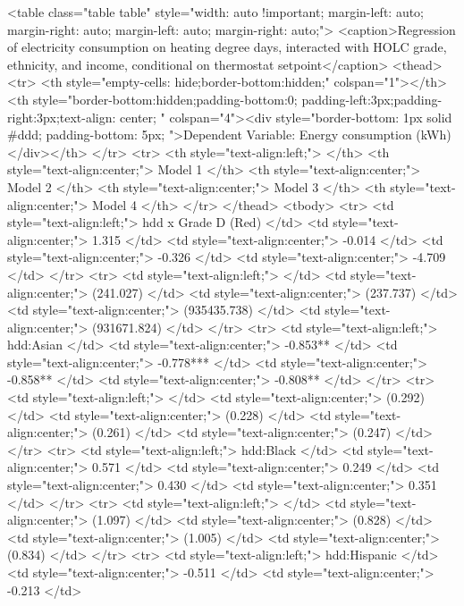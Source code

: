 <table class="table table" style="width: auto !important; margin-left: auto; margin-right: auto; margin-left: auto; margin-right: auto;">
<caption>Regression of electricity consumption on heating degree days, interacted with HOLC grade, ethnicity, and income, conditional on thermostat setpoint\label{tab:electricresponsethemset2}</caption>
 <thead>
<tr>
<th style="empty-cells: hide;border-bottom:hidden;" colspan="1"></th>
<th style="border-bottom:hidden;padding-bottom:0; padding-left:3px;padding-right:3px;text-align: center; " colspan="4"><div style="border-bottom: 1px solid #ddd; padding-bottom: 5px; ">Dependent Variable: Energy consumption (kWh)</div></th>
</tr>
  <tr>
   <th style="text-align:left;">   </th>
   <th style="text-align:center;"> Model 1 </th>
   <th style="text-align:center;"> Model 2 </th>
   <th style="text-align:center;"> Model 3 </th>
   <th style="text-align:center;"> Model 4 </th>
  </tr>
 </thead>
<tbody>
  <tr>
   <td style="text-align:left;"> hdd x Grade D (Red) </td>
   <td style="text-align:center;"> 1.315 </td>
   <td style="text-align:center;"> -0.014 </td>
   <td style="text-align:center;"> -0.326 </td>
   <td style="text-align:center;"> -4.709 </td>
  </tr>
  <tr>
   <td style="text-align:left;">  </td>
   <td style="text-align:center;"> (241.027) </td>
   <td style="text-align:center;"> (237.737) </td>
   <td style="text-align:center;"> (935435.738) </td>
   <td style="text-align:center;"> (931671.824) </td>
  </tr>
  <tr>
   <td style="text-align:left;"> hdd:Asian </td>
   <td style="text-align:center;"> -0.853** </td>
   <td style="text-align:center;"> -0.778*** </td>
   <td style="text-align:center;"> -0.858** </td>
   <td style="text-align:center;"> -0.808** </td>
  </tr>
  <tr>
   <td style="text-align:left;">  </td>
   <td style="text-align:center;"> (0.292) </td>
   <td style="text-align:center;"> (0.228) </td>
   <td style="text-align:center;"> (0.261) </td>
   <td style="text-align:center;"> (0.247) </td>
  </tr>
  <tr>
   <td style="text-align:left;"> hdd:Black </td>
   <td style="text-align:center;"> 0.571 </td>
   <td style="text-align:center;"> 0.249 </td>
   <td style="text-align:center;"> 0.430 </td>
   <td style="text-align:center;"> 0.351 </td>
  </tr>
  <tr>
   <td style="text-align:left;">  </td>
   <td style="text-align:center;"> (1.097) </td>
   <td style="text-align:center;"> (0.828) </td>
   <td style="text-align:center;"> (1.005) </td>
   <td style="text-align:center;"> (0.834) </td>
  </tr>
  <tr>
   <td style="text-align:left;"> hdd:Hispanic </td>
   <td style="text-align:center;"> -0.511 </td>
   <td style="text-align:center;"> -0.213 </td>
